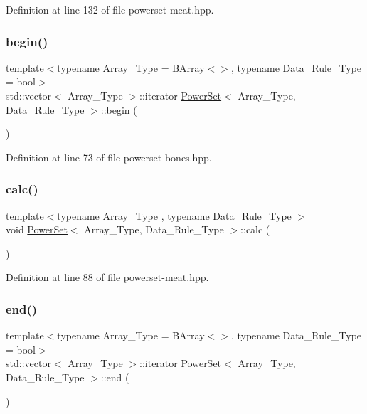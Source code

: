 Definition at line 132 of file powerset-\/meat.\+hpp.

\mbox{\label{class_power_set_abed9d58db924366d8a38baf168131fc3}} 
\subsubsection{\texorpdfstring{begin()}{begin()}}
{\footnotesize\ttfamily template$<$typename Array\+\_\+\+Type  = B\+Array$<$$>$, typename Data\+\_\+\+Rule\+\_\+\+Type  = bool$>$ \\
std\+::vector$<$ Array\+\_\+\+Type $>$\+::iterator \hyperlink{class_power_set}{Power\+Set}$<$ Array\+\_\+\+Type, Data\+\_\+\+Rule\+\_\+\+Type $>$\+::begin (\begin{DoxyParamCaption}{ }\end{DoxyParamCaption})\hspace{0.3cm}{\ttfamily [inline]}}



Definition at line 73 of file powerset-\/bones.\+hpp.

\mbox{\label{class_power_set_ad3b707294498105b2cc1a04017cc96d2}} 
\subsubsection{\texorpdfstring{calc()}{calc()}}
{\footnotesize\ttfamily template$<$typename Array\+\_\+\+Type , typename Data\+\_\+\+Rule\+\_\+\+Type $>$ \\
void \hyperlink{class_power_set}{Power\+Set}$<$ Array\+\_\+\+Type, Data\+\_\+\+Rule\+\_\+\+Type $>$\+::calc (\begin{DoxyParamCaption}{ }\end{DoxyParamCaption})\hspace{0.3cm}{\ttfamily [inline]}}



Definition at line 88 of file powerset-\/meat.\+hpp.

\mbox{\label{class_power_set_ac734ed684aa314b722a05d423c607a38}} 
\subsubsection{\texorpdfstring{end()}{end()}}
{\footnotesize\ttfamily template$<$typename Array\+\_\+\+Type  = B\+Array$<$$>$, typename Data\+\_\+\+Rule\+\_\+\+Type  = bool$>$ \\
std\+::vector$<$ Array\+\_\+\+Type $>$\+::iterator \hyperlink{class_power_set}{Power\+Set}$<$ Array\+\_\+\+Type, Data\+\_\+\+Rule\+\_\+\+Type $>$\+::end (\begin{DoxyParamCaption}{ }\end{DoxyParamCaption})\hspace{0.3cm}{\ttfamily [inline]}}



